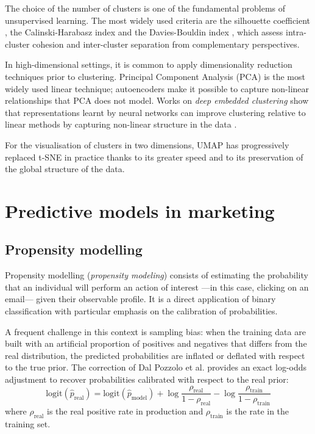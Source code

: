 The choice of the number of clusters is one of the fundamental problems of unsupervised learning. The most widely used criteria are the silhouette coefficient \cite{rousseeuw1987}, the Calinski-Harabasz index \cite{calinski1974} and the Davies-Bouldin index \cite{davies1979}, which assess intra-cluster cohesion and inter-cluster separation from complementary perspectives.

In high-dimensional settings, it is common to apply dimensionality reduction techniques prior to clustering. Principal Component Analysis (PCA) \cite{jolliffe2002} is the most widely used linear technique; autoencoders \cite{hinton2006} make it possible to capture non-linear relationships that PCA does not model. Works on \textit{deep embedded clustering} show that representations learnt by neural networks can improve clustering relative to linear methods by capturing non-linear structure in the data \cite{xie2016}.

For the visualisation of clusters in two dimensions, UMAP \cite{mcinnes2018} has progressively replaced t-SNE \cite{vandermaaten2008} in practice thanks to its greater speed and to its preservation of the global structure of the data.

\section{Predictive models in marketing}

\subsection{Propensity modelling}

Propensity modelling (\textit{propensity modeling}) consists of estimating the probability that an individual will perform an action of interest ---in this case, clicking on an email--- given their observable profile. It is a direct application of binary classification with particular emphasis on the calibration of probabilities.

A frequent challenge in this context is sampling bias: when the training data are built with an artificial proportion of positives and negatives that differs from the real distribution, the predicted probabilities are inflated or deflated with respect to the true prior. The correction of Dal Pozzolo et al. \cite{dalpozzolo2015} provides an exact log-odds adjustment to recover probabilities calibrated with respect to the real prior:
\begin{equation}
    \text{logit}(\hat{p}_\text{real}) = \text{logit}(\hat{p}_\text{model}) + \log\frac{\rho_\text{real}}{1-\rho_\text{real}} - \log\frac{\rho_\text{train}}{1-\rho_\text{train}}
    \label{eq:prior_correction}
\end{equation}
where $\rho_\text{real}$ is the real positive rate in production and $\rho_\text{train}$ is the rate in the training set.

